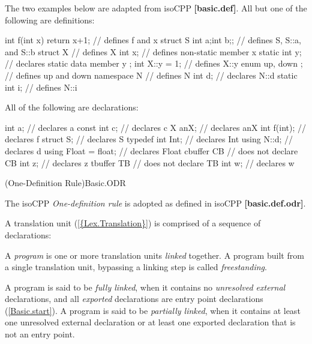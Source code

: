 \p The two examples below are adapted from \gls{isoCPP} \textbf{[basic.def]}. All
but one of the following are definitions:
\begin{HLSL}
int f(int x) { return x+1; } // defines f and x
struct S {int a;int b;};     // defines S, S::a, and S::b
struct X {                   // defines X
  int x;                     // defines non-static member x
  static int y;              // declares static data member y
};
int X::y = 1;                // defines X::y
enum { up, down };           // defines up and down
namespace N {                // defines N
int d;                       // declares N::d
static int i;                // defines N::i
}
\end{HLSL}

\p All of the following are declarations:
\begin{HLSL}
int a;                       // declares a
const int c;                 // declares c
X anX;                       // declares anX
int f(int);                  // declares f
struct S;                    // declares S
typedef int Int;             // declares Int
using N::d;                  // declares d
using Float = float;         // declares Float
cbuffer CB {                 // does not declare CB
  int z;                     // declares z
}
tbuffer TB {                 // does not declare TB
  int w;                     // declares w
}
\end{HLSL}

\Sec(One-Definition Rule){Basic.ODR}

\p The \gls{isoCPP} \textit{One-definition rule} is adopted as defined in
\gls{isoCPP} \textbf{[basic.def.odr]}.




\p A translation unit (\ref{{Lex.Translation}}) is comprised of a sequence of
declarations:

\begin{grammar}
  \br
\end{grammar}

\p A \textit{program} is one or more translation units \textit{linked} together.
A program built from a single translation unit, bypassing a linking step is
called \textit{freestanding}.

\p A program is said to be \textit{fully linked}, when it contains no
\textit{unresolved external} declarations, and all \textit{exported}
declarations are entry point declarations (\ref{Basic.start}). A program is said
to be \textit{partially linked}, when it contains at least one unresolved
external declaration or at least one exported declaration that is not an entry
point.

